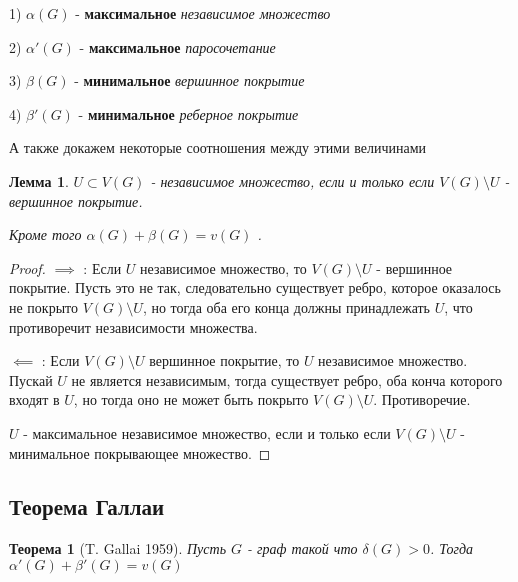 \documentclass{article}
\newtheorem{theorem}{Теорема}
\newtheorem{lemma}{Лемма}
\theoremstyle{definition}
\theoremstyle{remark}
\begin{document}
    1) $\alpha(G)$ - \textbf{максимальное} \textit{независимое множество} 

    2) $\alpha'(G)$ - \textbf{максимальное} \textit{паросочетание} 

    3) $\beta(G)$ - \textbf{минимальное} \textit{вершинное покрытие} 

    4) $\beta'(G)$ - \textbf{минимальное} \textit{реберное покрытие} 

    
А также докажем некоторые соотношения между этими величинами

\begin{lemma} 
      $U \subset V(G) $ - независимое множество, если и только если $V(G) \setminus U$ - вершинное покрытие. 
      
      Кроме того $\alpha(G) + \beta(G) = v(G)$ . \label{lemma6} 
\end{lemma}
\begin{proof}

    $\implies$ : Если $U$ независимое множество, то $V(G) \setminus U$ - вершинное покрытие.
    Пусть это не так, следовательно существует ребро, которое оказалось не покрыто  $V(G) \setminus U$, но тогда оба его конца должны принадлежать $U$, что противоречит независимости множества.

    $\impliedby$ : Если $V(G) \setminus U$ вершинное покрытие, то  $U$ независимое множество. Пускай $U$ не является независимым, тогда существует ребро, оба конча которого входят в $U$, но тогда оно не может быть покрыто $V(G) \setminus U$. Противоречие.

    $U$ -  максимальное независимое множество, если и только если $V(G) \setminus U$ - минимальное покрывающее множество.
\end{proof}

\subsection{Теорема Галлаи}

\begin{theorem} [T. Gallai 1959]
    Пусть $G$ - граф такой что $\delta(G)  > 0$. Тогда  $\alpha'(G) + \beta'(G) = v(G)$
\end{theorem}
\end{document}
